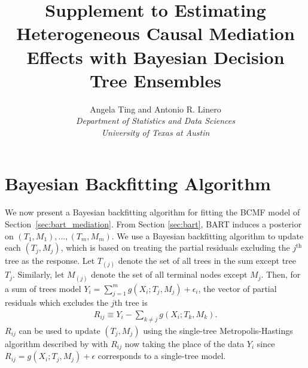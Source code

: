 \documentclass[12pt]{article}
\newcommand{\mythanks}[1]{\thanks{\parbox[t]{0.95\textwidth}{#1}}}
\theoremstyle{remark}
\theoremstyle{definition}
\begin{document}
\date{}
\title{Supplement to Estimating Heterogeneous Causal Mediation Effects with Bayesian Decision Tree Ensembles}

\author{
  \normalsize Angela Ting and Antonio R. Linero \\
  \normalsize \emph{Department of Statistics and Data Sciences} \\
  \normalsize \emph{University of Texas at Austin}
}

\maketitle
\doublespacing

\renewcommand{\thesection}{S.\arabic{section}}
\renewcommand{\theequation}{S.\arabic{equation}}
\renewcommand{\thepage}{S.\arabic{page}}
\renewcommand{\thetheorem}{S.\arabic{theorem}}
\renewcommand{\theproposition}{S.\arabic{proposition}}
\renewcommand{\thetable}{S.\arabic{table}}
\renewcommand{\thefigure}{S.\arabic{figure}}
\renewcommand{\thelemma}{S.\arabic{lemma}}
\thispagestyle{fancy}
\pagestyle{fancy}

\section{Bayesian Backfitting Algorithm}

We now present a Bayesian backfitting algorithm for fitting the BCMF model of Section~\ref{sec:bart_mediation}. From Section \ref{sec:bart}, BART induces a posterior on $(T_1, M_1),..., (T_m, M_m)$. We use a Bayesian backfitting algorithm \citep{chipman2010bart} to update each $(T_j, M_j)$, which is based on treating the partial residuals excluding the $j^{\text{th}}$ tree as the response. Let $T_{(j)}$ denote the set of all trees in the sum except tree $T_j$. Similarly, let $M_{(j)}$ denote the set of all terminal nodes except $M_j$. Then, for a sum of trees model $Y_i = \sum_{j=1}^m g(X_i; T_j, M_j) + \epsilon_i$, the vector of partial residuals which excludes the $j$th tree is
\begin{align*}
  R_{ij} \equiv Y_i - \sum_{k \neq j} g(X_i; T_k, M_k).
\end{align*}
$R_{ij}$ can be used to update $(T_j, M_j)$ using the single-tree Metropolis-Hastings algorithm described by \citet{chipman1998bayesian} with $R_{ij}$ now taking the place of the data $Y_i$ since $R_{ij} = g(X_i; T_j, M_j) + \epsilon$ corresponds to a single-tree model.
\end{document}
